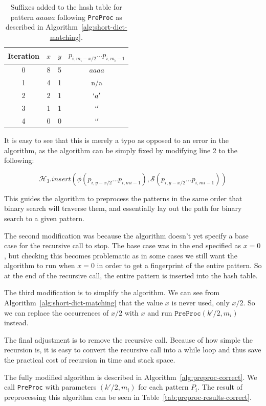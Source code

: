 \documentclass[ %
                    author={Dominic Joseph Moylett},
                    degree={MEng},
                     title={Dictionary Matching with Fingerprints},
                  subtitle={An Empirical Analysis},
                      type={research},
                      year={2015} ]{dissertation}
\begin{document}
\begin{table}[t]
  \centering
  \begin{tabular}{|c|c|c|c|}
    \hline
    Iteration & $x$ & $y$ & $p_{i, m_i-x/2}...p_{i, m_i - 1}$ \\\hline
    0 & 8 & 5 & $aaaa$ \\\hline
    1 & 4 & 1 & n/a \\\hline
    2 & 2 & 1 & $`a'$ \\\hline
    3 & 1 & 1 & $`'$ \\\hline
    4 & 0 & 0 & $`'$ \\\hline
  \end{tabular}
  \caption{Suffixes added to the hash table for pattern $aaaaa$ following \texttt{PreProc} as described in Algorithm~\ref{alg:short-dict-matching}.}
  \label{tab:preproc-results-incorrect}
\end{table}

It is easy to see that this is merely a typo as opposed to an error in the algorithm, as the algorithm can be simply fixed by modifying line 2 to the following:

$$\mathcal{H}_3.insert(\phi(p_{i, y - x/2}...p_{i, m{i} - 1}), \mathcal{S}(p_{i, y - x/2}...p_{i, m{i} - 1}))$$

This guides the algorithm to preprocess the patterns in the same order that binary search will traverse them, and essentially lay out the path for binary search to a given pattern.

The second modification was because the algorithm doesn't yet specify a base case for the recursive call to stop. The base case was in the end specified as $x = 0$, but checking this becomes problematic as in some cases we still want the algorithm to run when $x = 0$ in order to get a fingerprint of the entire pattern. So at the end of the recursive call, the entire pattern is inserted into the hash table.

The third modification is to simplify the algorithm. We can see from Algorithm~\ref{alg:short-dict-matching} that the value $x$ is never used, only $x/2$. So we can replace the occurrences of $x/2$ with $x$ and run $\texttt{PreProc}(k'/2, m_i)$ instead.

The final adjustment is to remove the recursive call. Because of how simple the recursion is, it is easy to convert the recursive call into a while loop and thus save the practical cost of recursion in time and stack space.

The fully modified algorithm is described in Algorithm~\ref{alg:preproc-correct}. We call \texttt{PreProc} with parameters $(k'/2, m_i)$ for each pattern $P_i$. The result of preprocessing this algorithm can be seen in Table~\ref{tab:preproc-results-correct}.
\end{document}
